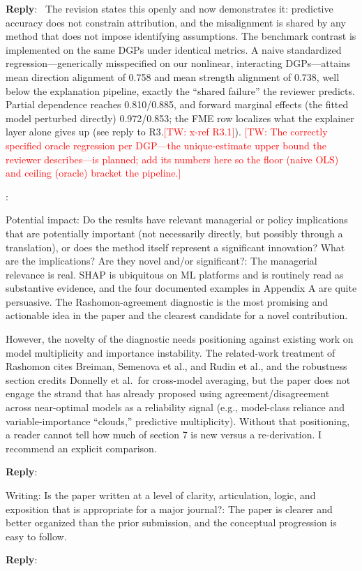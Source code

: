 \documentclass[11pt]{article}
\newcommand{\tw}[1]{\textcolor{red}{[TW: #1]}}
\newcounter{se}[section]
\newcounter{reviewer}
\newcounter{point}[reviewer]
\renewcommand{\thepoint}{R\,\thereviewer.\arabic{point}}
\newenvironment{point}{
    \refstepcounter{point} \bigskip \noindent {\textbf{\thepoint}}: \rmfamily \itshape
}{\medskip}
\newenvironment{point*}{\bigskip \noindent \rmfamily \itshape}{\medskip} %
\newenvironment{reply}
 {\par\medskip \noindent \begin{sf}\textbf{Reply}:\ }
 {\medskip \end{sf}}
\begin{document}
\begin{reply}
{\color{red}
The revision states this openly and now demonstrates it: predictive accuracy does not constrain attribution, and the misalignment is shared by any method that does not impose identifying assumptions. The benchmark contrast is implemented on the same DGPs under identical metrics. A naive standardized regression---generically misspecified on our nonlinear, interacting DGPs---attains mean direction alignment of 0.758 and mean strength alignment of 0.738, well below the explanation pipeline, exactly the ``shared failure'' the reviewer predicts. Partial dependence reaches 0.810/0.885, and forward marginal effects (the fitted model perturbed directly) 0.972/0.853; the FME row localizes what the explainer layer alone gives up (see reply to R3.\tw{x-ref R3.1}). \tw{The correctly specified oracle regression per DGP---the unique-estimate upper bound the reviewer describes---is planned; add its numbers here so the floor (naive OLS) and ceiling (oracle) bracket the pipeline.}
}
\end{reply}


\begin{point}
Potential impact: Do the results have relevant managerial or policy implications that are potentially important (not necessarily directly, but possibly through a translation), or does the method itself represent a significant innovation? What are the implications? Are they novel and/or significant?: The managerial relevance is real. SHAP is ubiquitous on ML platforms and is routinely read as substantive evidence, and the four documented examples in Appendix A are quite persuasive. The Rashomon-agreement diagnostic is the most promising and actionable idea in the paper and the clearest candidate for a novel contribution.

However, the novelty of the diagnostic needs positioning against existing work on model multiplicity and importance instability. The related-work treatment of Rashomon cites Breiman, Semenova et al., and Rudin et al., and the robustness section credits Donnelly et al.\ for cross-model averaging, but the paper does not engage the strand that has already proposed using agreement/disagreement across near-optimal models as a reliability signal (e.g., model-class reliance and variable-importance ``clouds,'' predictive multiplicity). Without that positioning, a reader cannot tell how much of section 7 is new versus a re-derivation. I recommend an explicit comparison.
\end{point}

\begin{reply}

\end{reply}


\begin{point*}
Writing: Is the paper written at a level of clarity, articulation, logic, and exposition that is appropriate for a major journal?: The paper is clearer and better organized than the prior submission, and the conceptual progression is easy to follow.
\end{point*}

\begin{reply}

\end{reply}
\end{document}
